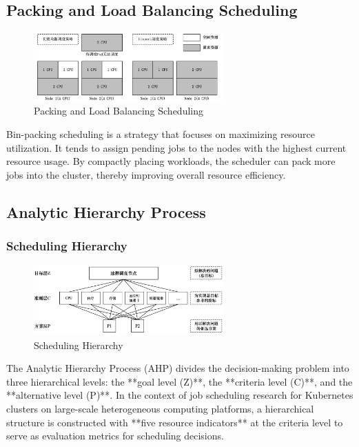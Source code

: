 \documentclass{article}
\begin{document}
\subsection{Packing and Load Balancing Scheduling}
\newpage
\begin{figure}[htbp]
  \centering
  \includegraphics[width=0.65\textwidth]{pic03.png} %
  \caption{Packing and Load Balancing Scheduling}
  \label{3}
\end{figure}
Bin-packing scheduling is a strategy that focuses on maximizing resource utilization. It tends to assign pending jobs to the nodes with the highest current resource usage. By compactly placing workloads, the scheduler can pack more jobs into the cluster, thereby improving overall resource efficiency.

\subsection{Analytic Hierarchy Process}
\subsubsection{Scheduling Hierarchy}
\begin{figure}[htbp]
  \centering
  \includegraphics[width=0.65\textwidth]{pic04.png} %
  \caption{Scheduling Hierarchy}
  \label{4}
\end{figure}
The Analytic Hierarchy Process (AHP) divides the decision-making problem into three hierarchical levels: the **goal level (Z)**, the **criteria level (C)**, and the **alternative level (P)**. In the context of job scheduling research for Kubernetes clusters on large-scale heterogeneous computing platforms, a hierarchical structure is constructed with **five resource indicators** at the criteria level to serve as evaluation metrics for scheduling decisions.
\end{document}
